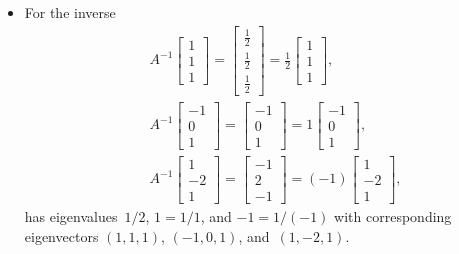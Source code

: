 \begin{example}
\begin{solution}
\begin{itemize}
\item For the inverse
\begin{eqnarray*}
&&A^{-1}\begin{bmatrix} 1\\1\\1 \end{bmatrix}
=\begin{bmatrix} \frac12\\\frac12\\\frac12 \end{bmatrix}
=\frac12\begin{bmatrix} 1\\1\\1 \end{bmatrix},
\\&&A^{-1}\begin{bmatrix} -1\\0\\1 \end{bmatrix}
=\begin{bmatrix} -1\\0\\1 \end{bmatrix}
=1\begin{bmatrix} -1\\0\\1 \end{bmatrix},
\\&&A^{-1}\begin{bmatrix} 1\\-2\\1 \end{bmatrix}
=\begin{bmatrix} -1\\2\\-1 \end{bmatrix}
=(-1)\begin{bmatrix} 1\\-2\\1 \end{bmatrix},
\end{eqnarray*}
has eigenvalues~\(1/2\), \(1=1/1\), and \(-1=1/(-1)\) with corresponding eigenvectors \((1,1,1)\),  \((-1,0,1)\), and~\((1,-2,1)\).

\end{itemize} 
\end{solution}
\end{example}




